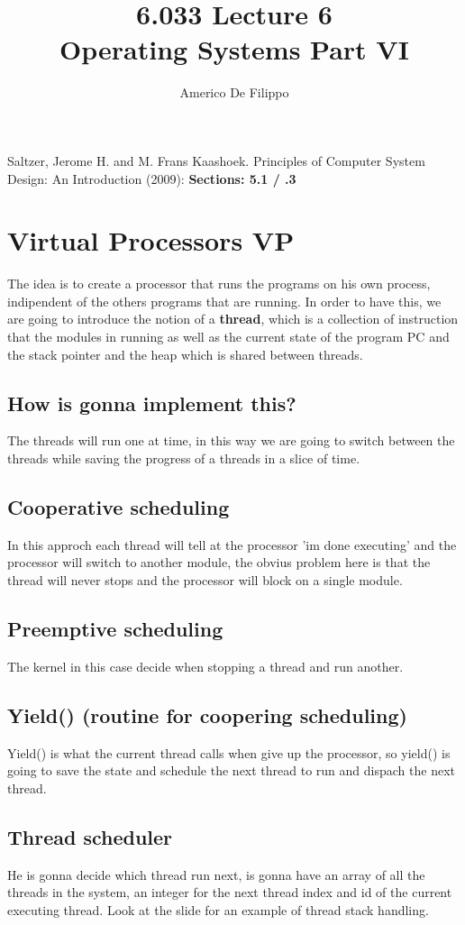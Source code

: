 \documentclass{article}
\title{6.033 Lecture 6 \\ Operating Systems Part VI}
\author{Americo De Filippo}
\begin{document}
 
  \maketitle
    \begin{thebibliography}{9}
    Saltzer, Jerome H. and M. Frans Kaashoek. Principles of Computer System Design: An Introduction (2009): \textbf{Sections: 5.1 / .3}
  \end{thebibliography}
  \section{Virtual Processors VP}
    The idea is to create a processor that runs the programs on his own
    process, indipendent of the others programs that are running. In order to 
    have this, we are going to introduce the notion of a \textbf{thread}, which is
    a collection of instruction that the modules in running as well as the current 
    state of the program PC and the stack pointer and the heap which is shared between
    threads.
    \subsection{How is gonna implement this?} The threads will run one at time, in this
      way we are going to switch between the threads while saving the progress of a threads
      in a slice of time.
    \subsection{Cooperative scheduling} In this approch each thread will tell at the processor
      'im done executing' and the processor will switch to another module, the obvius problem 
      here is that the thread will never stops and the processor will block on a single module.
    \subsection{Preemptive scheduling} The kernel in this case decide when stopping a thread 
      and run another.
    \subsection{Yield() (routine for coopering scheduling)} Yield() is what the current thread
      calls when give up the processor, so yield() is going to save the state and schedule the 
      next thread to run and dispach the next thread.
    \subsection{Thread scheduler} He is gonna decide which thread run next, is gonna have 
      an array of all the threads in the system, an integer for the next thread index and
      id of the current executing thread. Look at the slide for an example of thread stack
      handling.
\end{document}
